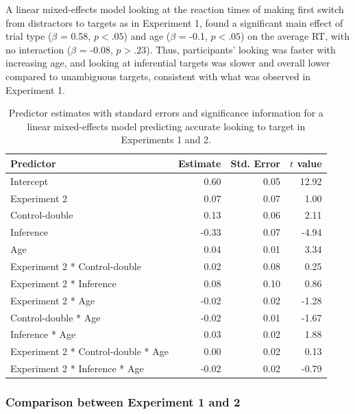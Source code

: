 \documentclass[a4paper,man,apacite,floatsintext]{apa6}
\begin{document}
A linear mixed-effects model looking at the reaction times of making
first switch from distractors to targets as in Experiment 1, found a
significant main effect of trial type (\(\beta\) = 0.58, \(p <.05\)) and
age (\(\beta\) = -0.1, \(p <.05\)) on the average RT, with no
interaction (\(\beta\) = -0.08, \(p >.23\)). Thus, participants' looking
was faster with increasing age, and looking at inferential targets was
slower and overall lower compared to unambiguous targets, consistent
with what was observed in Experiment 1.

\begin{table}[tb]
\centering
\begin{tabular}{lrrr}
 Predictor & Estimate & Std. Error & $t$ value \\ 
  \hline
Intercept & 0.60 & 0.05 & 12.92 \\ 
  Experiment 2 & 0.07 & 0.07 & 1.00 \\ 
  Control-double & 0.13 & 0.06 & 2.11 \\ 
  Inference & -0.33 & 0.07 & -4.94 \\ 
  Age & 0.04 & 0.01 & 3.34 \\ 
  Experiment 2 * Control-double & 0.02 & 0.08 & 0.25 \\ 
  Experiment 2 * Inference & 0.08 & 0.10 & 0.86 \\ 
  Experiment 2 * Age & -0.02 & 0.02 & -1.28 \\ 
  Control-double * Age & -0.02 & 0.01 & -1.67 \\ 
  Inference * Age & 0.03 & 0.02 & 1.88 \\ 
  Experiment 2 * Control-double * Age & 0.00 & 0.02 & 0.13 \\ 
  Experiment 2 * Inference * Age & -0.02 & 0.02 & -0.79 \\ 
   \hline
\end{tabular}
\caption{Predictor estimates with standard errors and significance information for a linear mixed-effects model predicting accurate looking to target in Experiments 1 and 2.} 
\label{tab:exp2_tab}
\end{table}

\subsubsection{Comparison between Experiment 1 and
2}\label{comparison-between-experiment-1-and-2}
\end{document}
